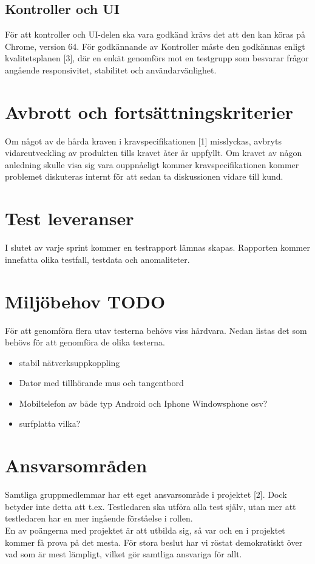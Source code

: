 \documentclass[10pt]{article}
\begin{document}
	\subsection{Kontroller och UI}
		För att kontroller och UI-delen ska vara godkänd krävs det att den kan köras på Chrome, version 64. För godkännande av Kontroller måste den godkännas enligt kvalitetsplanen {\color{red}[3]}, där en enkät genomförs mot en testgrupp som besvarar frågor angående responsivitet, stabilitet och användarvänlighet.



\section{Avbrott och fortsättningskriterier}
	Om något av de hårda kraven i kravspecifikationen {\color{red}[1]} misslyckas, avbryts vidareutveckling av produkten tills kravet åter är uppfyllt. Om kravet av någon anledning skulle visa sig vara ouppnåeligt kommer kravspecifikationen kommer problemet diskuteras internt för att sedan ta diskussionen vidare till kund. 



\section{Test leveranser}
	I slutet av varje sprint kommer en testrapport lämnas skapas. Rapporten kommer innefatta olika testfall, testdata och anomaliteter.


	

\section{Miljöbehov {\color{red}TODO}}
	För att genomföra flera utav testerna behövs viss hårdvara. Nedan listas det som behövs för att genomföra de olika testerna. 

	\begin{itemize}
	\item stabil nätverksuppkoppling
	\item Dator med tillhörande mus och tangentbord
	\item Mobiltelefon av både typ Android och Iphone {\color{red}Windowsphone osv?}
	\item surfplatta {\color{red}vilka?}
	\end{itemize}

\section{Ansvarsområden}
	Samtliga gruppmedlemmar har ett eget ansvarsområde i projektet {\color{red}[2]}. Dock betyder inte detta att t.ex. Testledaren ska utföra alla test själv, utan mer att testledaren har en mer ingående förståelse i rollen. \\
	En av poängerna med projektet är att utbilda sig, så var och en i projektet kommer få prova på det mesta. För stora beslut har vi röstat demokratiskt över vad som är mest lämpligt, vilket gör samtliga ansvariga för allt.
	
\end{document}
